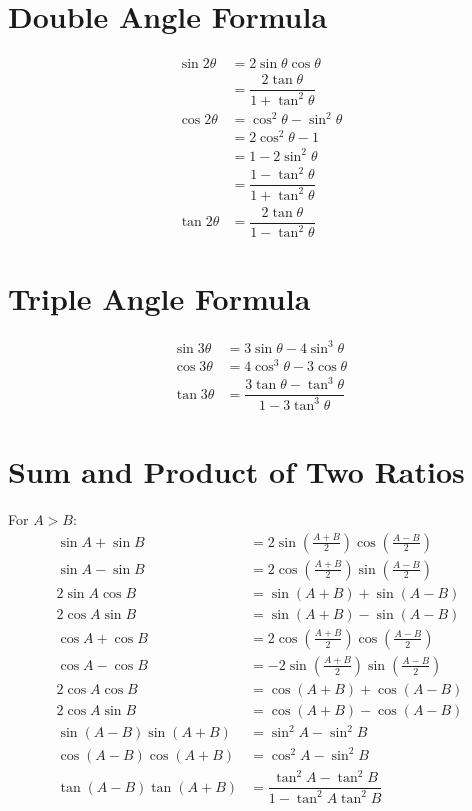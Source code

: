 \documentclass[../main.tex]{subfile}
\begin{document}
        \section{Double Angle Formula}
        \begin{align}
            \sin 2\theta & = 2\sin \theta \cos \theta\\
            & = \dfrac{2 \tan \theta}{1+\tan^2 \theta}\\
            \cos 2\theta & = \cos^2 \theta -\sin^2 \theta\\
            & = 2 \cos^2 \theta - 1\\
            & = 1 - 2 \sin^2 \theta\\
            & = \dfrac{1 - \tan^2 \theta}{1 + \tan^2 \theta}\\
            \tan 2 \theta & = \dfrac{2 \tan \theta}{1 - \tan^2 \theta}
        \end{align}
        
        \section{Triple Angle Formula}
        \begin{align}
        \sin 3\theta & = 3\sin \theta - 4 \sin^3 \theta\\
        \cos 3\theta & = 4\cos^3 \theta - 3 \cos \theta\\
        \tan 3\theta & = \dfrac{3\tan \theta - \tan^3 \theta}{1-3\tan^3 \theta}
        \end{align}
        
        \section{Sum and Product of Two Ratios}
        For $A>B$:
        \begin{align}
            \sin A + \sin B & = 2 \sin \left( \frac{A + B}{2} \right) \cos \left( \frac{A - B}{2} \right)\\
            \sin A - \sin B & = 2 \cos \left( \frac{A + B}{2} \right) \sin \left( \frac{A - B}{2} \right)\\
            2 \sin A \cos B & = \sin(A + B) + \sin(A - B)\\
            2 \cos A \sin B & = \sin(A + B) - \sin(A - B)\\
            \cos A + \cos B & = 2 \cos \left( \frac{A + B}{2} \right) \cos \left( \frac{A - B}{2} \right)\\
            \cos A - \cos B & = - 2 \sin \left( \frac{A + B}{2} \right) \sin \left( \frac{A - B}{2} \right)\\
            2 \cos A\cos B & = \cos (A+B)+\cos (A-B)\\
            2 \cos A\sin B & = \cos (A+B)-\cos (A-B)\\
            \sin (A-B)\sin(A+B) & = \sin^2 A-\sin^2 B\\
            \cos (A-B)\cos(A+B) & = \cos^2 A-\sin^2 B\\
            \tan (A-B)\tan(A+B) & = \dfrac{\tan^2 A - \tan^2 B}{1-\tan^2 A\tan^2 B}
        \end{align}
        
\end{document}
